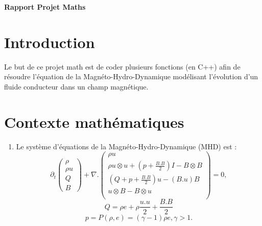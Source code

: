 \documentclass[a4paper,10pt]{article}
\begin{document}
  \begin{center}
  \textbf{\huge{Rapport Projet Maths}}
  \end{center}
  \section{Introduction}
    Le but de ce projet math est de coder plusieurs fonctions (en C++) afin de r\'esoudre l'\'equation de la Magn\'eto-Hydro-Dynamique mod\'elisant l'\'evolution d’un fluide conducteur dans un champ magn\'etique.
  \section{Contexte math\'ematiques}
    \begin{enumerate}
    \item
      Le syst\`eme d'\'equations de la Magn\'eto-Hydro-Dynamique (MHD) est :
    \begin{equation}
      \partial_t
      \left( \begin{array}{c}
      \rho \\
      \rho u \\
      Q \\
      B
      \end{array}
    \right)
    + \nabla .
    \left( \begin{array}{c}
      \rho u \\
      \rho u \otimes u + (p + \frac{B.B}{2})I - B \otimes B \\
      (Q + p + \frac{B.B}{2})u - (B.u)B \\
      u \otimes B - B \otimes u \\
      \end{array}
    \right)
    = 0,
    \end{equation}
    \begin{equation}
      Q = \rho e + \rho \frac{u.u}{2} + \frac{B.B}{2}
    \end{equation}
    \begin{equation}
      p = P(\rho,e) = (\gamma - 1)\rho e, \gamma > 1.
    \end{equation} \\



\end{enumerate}
\end{document}
